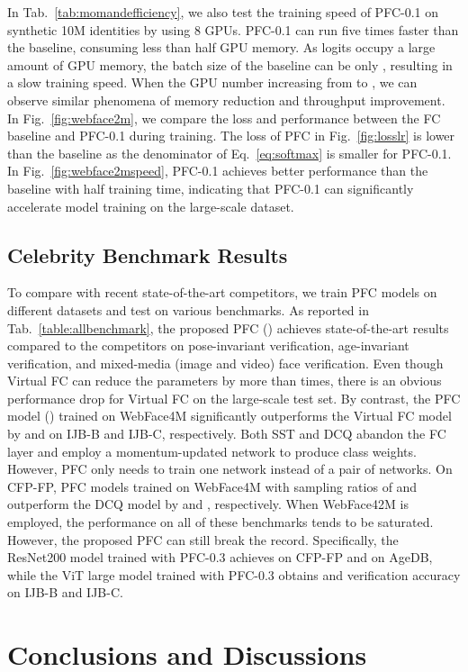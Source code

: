 \documentclass[10pt,twocolumn,letterpaper]{article}
\begin{document}
In Tab.~\ref{tab:momandefficiency}, we also test the training speed of PFC-0.1 on synthetic 10M identities by using 8 GPUs. PFC-0.1 can run five times faster than the baseline, consuming less than half GPU memory. As logits occupy a large amount of GPU memory, the batch size of the baseline can be only , resulting in a slow training speed. When the GPU number increasing from  to , we can observe similar phenomena of memory reduction and throughput improvement. In Fig.~\ref{fig:webface2m}, we compare the loss and performance between the FC baseline and PFC-0.1 during training. The loss of PFC in Fig.~\ref{fig:losslr} is lower than the baseline as the denominator of Eq.~\ref{eq:softmax} is smaller for PFC-0.1. In Fig.~\ref{fig:webface2mspeed}, PFC-0.1 achieves better performance than the baseline with half training time, indicating that PFC-0.1 can significantly accelerate model training on the large-scale dataset.

\subsection{Celebrity Benchmark Results}
To compare with recent state-of-the-art competitors, we train PFC models on different datasets and test on various benchmarks. As reported in Tab.~\ref{table:allbenchmark}, the proposed PFC () achieves state-of-the-art results compared to the competitors on pose-invariant verification, age-invariant verification, and mixed-media (image and video) face verification. Even though Virtual FC \cite{li2021virtual} can reduce the parameters by more than  times, there is an obvious performance drop for Virtual FC on the large-scale test set. By contrast, the PFC model () trained on WebFace4M significantly outperforms the Virtual FC model by  and  on IJB-B and IJB-C, respectively. Both SST \cite{du2020semi} and DCQ \cite{bi2021dcq} abandon the FC layer and employ a momentum-updated network to produce class weights. However, PFC only needs to train one network instead of a pair of networks. On CFP-FP, PFC models trained on WebFace4M with sampling ratios of  and  outperform the DCQ model by  and , respectively. When WebFace42M \cite{zhu2021webface260m} is employed, the performance on all of these benchmarks tends to be saturated. However, the proposed PFC can still break the record. Specifically, the ResNet200 model trained with PFC-0.3 achieves  on CFP-FP and  on AgeDB, while the ViT large model trained with PFC-0.3 obtains  and  verification accuracy on IJB-B and IJB-C.

\section{Conclusions and Discussions}
\end{document}
